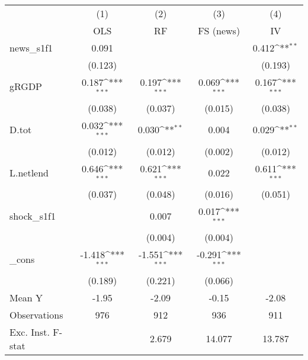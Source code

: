 {
\def\sym#1{\ifmmode^{#1}\else\(^{#1}\)\fi}
\begin{tabular}{l*{4}{c}}
\toprule
            &\multicolumn{1}{c}{(1)}&\multicolumn{1}{c}{(2)}&\multicolumn{1}{c}{(3)}&\multicolumn{1}{c}{(4)}\\
            &\multicolumn{1}{c}{OLS}&\multicolumn{1}{c}{RF}&\multicolumn{1}{c}{FS (news)}&\multicolumn{1}{c}{IV}\\
\midrule
news\_s1f1   &       0.091         &                     &                     &       0.412\sym{**} \\
            &     (0.123)         &                     &                     &     (0.193)         \\
\addlinespace
gRGDP       &       0.187\sym{***}&       0.197\sym{***}&       0.069\sym{***}&       0.167\sym{***}\\
            &     (0.038)         &     (0.037)         &     (0.015)         &     (0.038)         \\
\addlinespace
D.tot       &       0.032\sym{***}&       0.030\sym{**} &       0.004         &       0.029\sym{**} \\
            &     (0.012)         &     (0.012)         &     (0.002)         &     (0.012)         \\
\addlinespace
L.netlend   &       0.646\sym{***}&       0.621\sym{***}&       0.022         &       0.611\sym{***}\\
            &     (0.037)         &     (0.048)         &     (0.016)         &     (0.051)         \\
\addlinespace
shock\_s1f1  &                     &       0.007         &       0.017\sym{***}&                     \\
            &                     &     (0.004)         &     (0.004)         &                     \\
\addlinespace
\_cons      &      -1.418\sym{***}&      -1.551\sym{***}&      -0.291\sym{***}&                     \\
            &     (0.189)         &     (0.221)         &     (0.066)         &                     \\
\midrule
Mean Y      &       -1.95         &       -2.09         &       -0.15         &       -2.08         \\
Observations&         976         &         912         &         936         &         911         \\
Exc. Inst. F-stat&                     &       2.679         &      14.077         &      13.787         \\
\bottomrule
\end{tabular}
}

